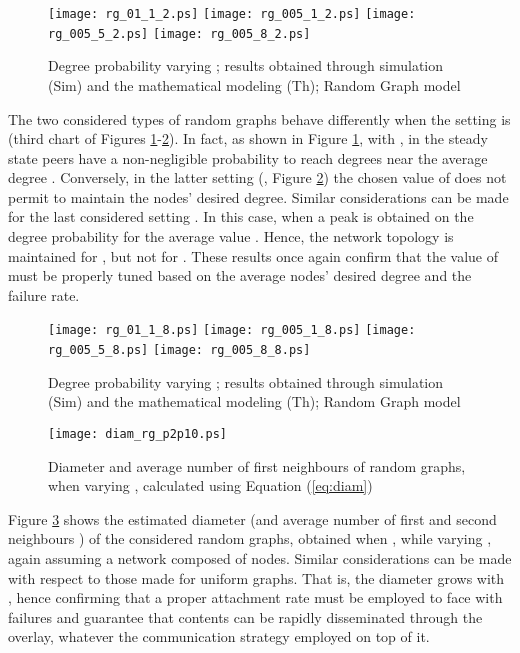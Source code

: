 \documentclass[a4paper,twosided]{article}
\begin{document}
\begin{figure}
   \centering
   \texttt{[image: rg\_01\_1\_2.ps]}
   \texttt{[image: rg\_005\_1\_2.ps]}
   \texttt{[image: rg\_005\_5\_2.ps]}
   \texttt{[image: rg\_005\_8\_2.ps]}
   \caption{Degree probability varying ; results obtained through simulation (Sim) and the mathematical modeling (Th); Random Graph model }   
   \label{fig:fig_rg3}
\end{figure}

The two considered types of random graphs behave differently when the setting is  (third chart of Figures \ref{fig:fig_rg3}-\ref{fig:fig_rg4}). In fact, as shown in Figure \ref{fig:fig_rg3}, with , in the steady state peers have a non-negligible probability to reach degrees near the average degree . Conversely, in the latter setting (, Figure \ref{fig:fig_rg4}) the chosen value of  does not permit to maintain the nodes' desired degree. Similar considerations can be made for the last considered setting . In this case, when  a peak is obtained on the degree probability for the average value . Hence, the network topology is maintained for , but not for .
These results once again confirm that the value of  must be properly tuned based on the average nodes' desired degree and the failure rate.


\begin{figure}
   \centering
   \texttt{[image: rg\_01\_1\_8.ps]}
   \texttt{[image: rg\_005\_1\_8.ps]}
   \texttt{[image: rg\_005\_5\_8.ps]}
   \texttt{[image: rg\_005\_8\_8.ps]}
   \caption{Degree probability varying ; results obtained through simulation (Sim) and the mathematical modeling (Th); Random Graph model }   
   \label{fig:fig_rg4}
\end{figure}



\begin{figure}
   \centering
   \texttt{[image: diam\_rg\_p2p10.ps]}
   \caption{Diameter and average number of first neighbours of random graphs, when varying , calculated using Equation (\ref{eq:diam})}
   \label{fig:diam_rg}
\end{figure}

Figure \ref{fig:diam_rg} shows the estimated diameter (and average number of first  and second neighbours ) of the considered random graphs, obtained when , while varying , again assuming a network composed of  nodes. 
Similar considerations can be made with respect to those made for uniform graphs. 
That is, the diameter grows with , hence confirming that a proper attachment rate must be employed to face with failures and guarantee that contents can be rapidly disseminated through the overlay, whatever the communication strategy employed on top of it.
\end{document}
